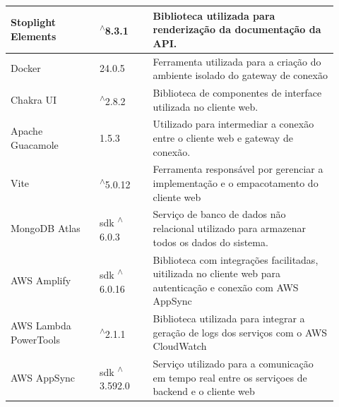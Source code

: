 \begin{longtable}{p{0.25\linewidth} p{0.15\linewidth} p{0.525\linewidth}}
\hline

Stoplight Elements \citep{stoplightdocs} & \textsuperscript{$\wedge$}8.3.1 & Biblioteca utilizada para renderização da documentação da API. \\

\hline

Docker \citep{dockerdocs} & 24.0.5 & Ferramenta utilizada para a criação do ambiente isolado do gateway de conexão \\

\hline

Chakra UI \citep{chakrauidocs} & \textsuperscript{$\wedge$}2.8.2 & Biblioteca de componentes de interface utilizada no cliente web. \\

\hline

Apache Guacamole \citep{apacheguacamoledocs} & 1.5.3 & Utilizado para intermediar a conexão entre o cliente web e gateway de conexão. \\

\hline

Vite \citep{vitedocs} & \textsuperscript{$\wedge$}5.0.12 & Ferramenta responsável por gerenciar a implementação e o empacotamento do cliente web \\

\hline

MongoDB Atlas \citep{mongodbatlasdocs} & sdk \textsuperscript{$\wedge$}6.0.3 & Serviço de banco de dados não relacional utilizado para armazenar todos os dados do sistema. \\

\hline

AWS Amplify \citep{awsamplifydocs} & sdk \textsuperscript{$\wedge$}6.0.16 & Biblioteca com integrações facilitadas, uitilizada no cliente web para autenticação e conexão com AWS AppSync \\

\hline

AWS Lambda PowerTools \citep{awslambdapowertools} & \textsuperscript{$\wedge$}2.1.1 & Biblioteca utilizada para integrar a geração de logs dos serviços com o AWS CloudWatch \\

\hline

AWS AppSync \citep{awsappsync} & sdk \textsuperscript{$\wedge$}3.592.0 & Serviço utilizado para a comunicação em tempo real entre os serviçoes de backend e o cliente web \\

\hline


\end{longtable}
